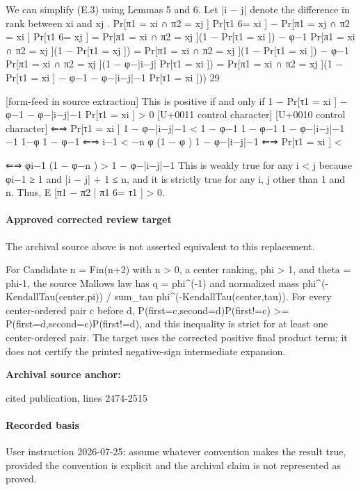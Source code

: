 \documentclass[10pt]{article}
\begin{document}
\begin{ReviewVerbatim}
We can simplify (E.3) using Lemmas 5 and 6. Let |i − j| denote the difference in rank between xi and xj .
Pr[π1 = xi ∩ π2 = xj ] Pr[τ1 6= xi ] − Pr[π1 = xj ∩ π2 = xi ] Pr[τ1 6= xj ]
= Pr[π1 = xi ∩ π2 = xj ](1 − Pr[τ1 = xi ]) − φ−1 Pr[π1 = xi ∩ π2 = xj ](1 − Pr[τ1 = xj ])
= Pr[π1 = xi ∩ π2 = xj ](1 − Pr[τ1 = xi ]) − φ−1 Pr[π1 = xi ∩ π2 = xj ](1 − φ−|i−j| Pr[τ1 = xi ])
= Pr[π1 = xi ∩ π2 = xj ](1 − Pr[τ1 = xi ] − φ−1 − φ−|i−j|−1 Pr[τ1 = xi ]))
29


[form-feed in source extraction]
This is positive if and only if
1 − Pr[τ1 = xi ] − φ−1 − φ−|i−j|−1 Pr[τ1 = xi ] > 0
[U+0011 control character]
[U+0010 control character]
⇐⇒ Pr[τ1 = xi ] 1 − φ−|i−j|−1 < 1 − φ−1
1 − φ−1
1 − φ−|i−j|−1
−1
1−φ
1 − φ−1
⇐⇒ i−1
<
−n
φ (1 − φ )
1 − φ−|i−j|−1
⇐⇒ Pr[τ1 = xi ] <

⇐⇒ φi−1 (1 − φ−n ) > 1 − φ−|i−j|−1
This is weakly true for any i < j because φi−1 ≥ 1 and |i − j| + 1 ≤ n, and it is strictly true for any i, j
other than 1 and n. Thus, E [π1 − π2 | π1 6= τ1 ] > 0.
\end{ReviewVerbatim}

\paragraph{Approved corrected review target}
The archival source above is not asserted equivalent to this replacement.
\begin{ReviewVerbatim}
For Candidate n = Fin(n+2) with n > 0, a center ranking, phi > 1, and theta = phi-1, the source Mallows law has q = phi^(-1) and normalized mass phi^(-KendallTau(center,pi)) / sum_tau phi^(-KendallTau(center,tau)). For every center-ordered pair c before d, P(first=c,second=d)P(first!=c) >= P(first=d,second=c)P(first!=d), and this inequality is strict for at least one center-ordered pair. The target uses the corrected positive final product term; it does not certify the printed negative-sign intermediate expansion.
\end{ReviewVerbatim}

\textbf{Archival source anchor:} {\footnotesize\raggedright cited publication, lines 2474-\allowbreak{}2515\par}
\paragraph{Recorded basis}
User instruction 2026-\allowbreak{}07-\allowbreak{}25:\allowbreak{} assume whatever convention makes the result true, provided the convention is explicit and the archival claim is not represented as proved.\allowbreak{}
\end{document}
